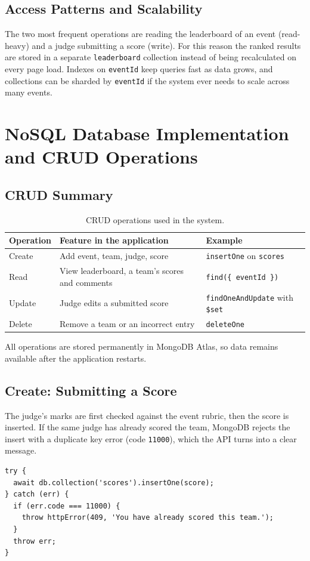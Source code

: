 \documentclass[11pt,a4paper]{article}
\begin{document}
\subsection{Access Patterns and Scalability}
The two most frequent operations are reading the leaderboard of an event (read-heavy) and a judge submitting a score (write). For this reason the ranked results are stored in a separate \texttt{leaderboard} collection instead of being recalculated on every page load. Indexes on \texttt{eventId} keep queries fast as data grows, and collections can be sharded by \texttt{eventId} if the system ever needs to scale across many events.

\section{NoSQL Database Implementation and CRUD Operations}

\subsection{CRUD Summary}
\begin{table}[H]
\centering
\begin{tabularx}{\textwidth}{l X l}
\toprule
\textbf{Operation} & \textbf{Feature in the application} & \textbf{Example} \\
\midrule
Create & Add event, team, judge, score            & \texttt{insertOne} on \texttt{scores} \\
Read   & View leaderboard, a team's scores and comments & \texttt{find(\{ eventId \})} \\
Update & Judge edits a submitted score            & \texttt{findOneAndUpdate} with \texttt{\$set} \\
Delete & Remove a team or an incorrect entry      & \texttt{deleteOne} \\
\bottomrule
\end{tabularx}
\caption{CRUD operations used in the system.}
\end{table}

All operations are stored permanently in MongoDB Atlas, so data remains available after the application restarts.

\subsection{Create: Submitting a Score}
The judge's marks are first checked against the event rubric, then the score is inserted. If the same judge has already scored the team, MongoDB rejects the insert with a duplicate key error (code \texttt{11000}), which the API turns into a clear message.
\begin{lstlisting}
try {
  await db.collection('scores').insertOne(score);
} catch (err) {
  if (err.code === 11000) {
    throw httpError(409, 'You have already scored this team.');
  }
  throw err;
}
\end{lstlisting}
\end{document}
